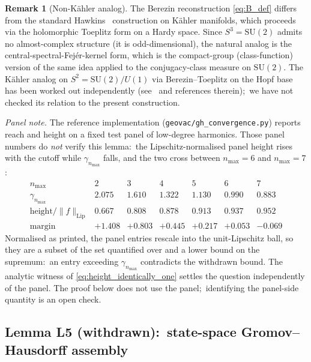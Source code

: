 \documentclass[11pt,a4paper]{article}
\theoremstyle{plain}
\theoremstyle{definition}
\newtheorem{remark}[theorem]{Remark}
\newcommand{\nmax}{n_{\max}}
\newcommand{\sthree}{S^{3}}
\newcommand{\SU}{\mathrm{SU}}
\begin{document}
\begin{remark}[Non-K\"ahler analog]
The Berezin reconstruction \eqref{eq:B_def} differs from the standard
Hawkins~\cite{hawkins2000} construction on K\"ahler manifolds, which
proceeds via the holomorphic Toeplitz form on a Hardy space. Since
$\sthree = \SU(2)$ admits no almost-complex structure
(it is odd-dimensional), the natural analog is the
central-spectral-Fej\'er-kernel form, which is the
compact-group (class-function) version
of the same idea applied to the conjugacy-class measure on $\SU(2)$.
The K\"ahler analog on $S^2 = \SU(2)/U(1)$ via Berezin--Toeplitz on
the Hopf base has been worked out independently
(see~\cite{ucp_maps_2024} and references therein);\ we have not
checked its relation to the present construction.
\end{remark}

\emph{Panel note.}  The reference implementation
(\texttt{geovac/gh\_convergence.py}) reports reach and height on a fixed
test panel of low-degree harmonics.  Those panel numbers do \emph{not}
verify this lemma:\ the Lipschitz-normalised panel height rises with the
cutoff while $\gamma_{\nmax}$ falls, and the two cross between
$\nmax = 6$ and $\nmax = 7$:
\[
  \begin{array}{c|cccccc}
    \nmax & 2 & 3 & 4 & 5 & 6 & 7 \\ \hline
    \gamma_{\nmax} & 2.075 & 1.610 & 1.322 & 1.130 & 0.990 & 0.883 \\
    \text{height}/\|f\|_{\mathrm{Lip}} & 0.667 & 0.808 & 0.878 & 0.913 & 0.937 & 0.952 \\
    \text{margin} & +1.408 & +0.803 & +0.445 & +0.217 & +0.053 & -0.069
  \end{array}
\]
Normalised as printed, the panel entries rescale into the
unit-Lipschitz ball, so they are a subset of the set quantified over and a
lower bound on the supremum:\ an entry exceeding $\gamma_{\nmax}$ contradicts
the withdrawn bound.  The analytic witness of
\eqref{eq:height_identically_one} settles the question independently of the
panel.  The proof
below does not use the panel;\ identifying the panel-side quantity is an
open check.

\subsection{Lemma L5 (withdrawn):\ state-space Gromov--Hausdorff assembly}
\label{sec:L5}
\end{document}
